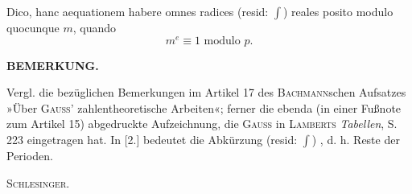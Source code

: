 Dico, hanc aequationem habere omnes radices (resid: $\int$) reales posito modulo quocunque
$m$, quando
\[m^e\equiv1\text{ modulo }p.\]
\begin{center}\textbf{BEMERKUNG.}\end{center}
\begingroup\small
\noindent\hspace*{\parindent}Vergl. die bezüglichen Bemerkungen im Artikel 17 des \textsc{Bachmann}schen
Aufsatzes »Über \textsc{Gauss}’ zahlentheoretische Arbeiten«; ferner die ebenda (in einer Fußnote
zum Artikel 15) abgedruckte Aufzeichnung, die \textsc{Gauss} in \textsc{Lamberts} \textit{Tabellen},
S. 223 eingetragen hat. In [2.] bedeutet die Abkürzung (resid: $\int$)
, d. h. Reste der Perioden.
\par\noindent\hfill\textsc{Schlesinger}.\par
\endgroup
\ClosingRule
\clearpage
